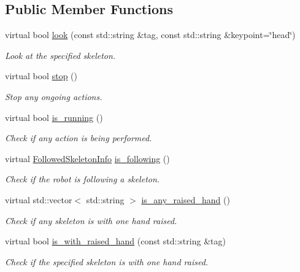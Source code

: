 \subsection*{Public Member Functions}
\begin{DoxyCompactItemize}
\item 
virtual bool \hyperlink{classattentionManager__IDL_a42941cc508bb57aa390578ecdbfde7c2}{look} (const std\+::string \&tag, const std\+::string \&keypoint=\char`\"{}head\char`\"{})
\begin{DoxyCompactList}\small\item\em Look at the specified skeleton. \end{DoxyCompactList}\item 
virtual bool \hyperlink{classattentionManager__IDL_aa5e3fb18a0336d8b65c316e7f6a675a8}{stop} ()
\begin{DoxyCompactList}\small\item\em Stop any ongoing actions. \end{DoxyCompactList}\item 
virtual bool \hyperlink{classattentionManager__IDL_ada750e5a7c6a0bb99be495e24d34dcdd}{is\+\_\+running} ()
\begin{DoxyCompactList}\small\item\em Check if any action is being performed. \end{DoxyCompactList}\item 
virtual \hyperlink{classFollowedSkeletonInfo}{Followed\+Skeleton\+Info} \hyperlink{classattentionManager__IDL_a03b844a8bd3d6e2b4cf5ba88ace27429}{is\+\_\+following} ()
\begin{DoxyCompactList}\small\item\em Check if the robot is following a skeleton. \end{DoxyCompactList}\item 
virtual std\+::vector$<$ std\+::string $>$ \hyperlink{classattentionManager__IDL_ad0b7882cea4dd8b0269cd3eaf0f5dbae}{is\+\_\+any\+\_\+raised\+\_\+hand} ()
\begin{DoxyCompactList}\small\item\em Check if any skeleton is with one hand raised. \end{DoxyCompactList}\item 
virtual bool \hyperlink{classattentionManager__IDL_aa6b2c971be0e878ab259675c83bba2dc}{is\+\_\+with\+\_\+raised\+\_\+hand} (const std\+::string \&tag)
\begin{DoxyCompactList}\small\item\em Check if the specified skeleton is with one hand raised. \end{DoxyCompactList}\item 

\end{DoxyCompactItemize}
